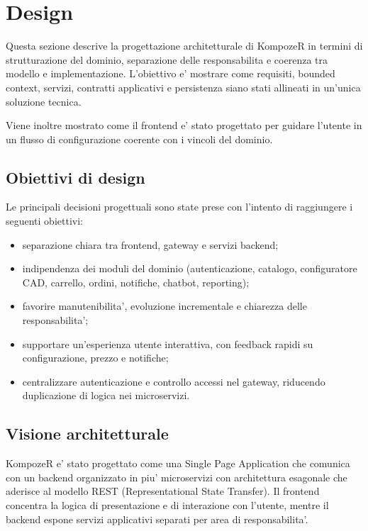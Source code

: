 \section{Design}

Questa sezione descrive la progettazione architetturale di KompozeR in termini di strutturazione del dominio, separazione delle responsabilita e coerenza tra modello e implementazione. L'obiettivo e' mostrare come requisiti, bounded context, servizi, contratti applicativi e persistenza siano stati allineati in un'unica soluzione tecnica.

Viene inoltre mostrato come il frontend e' stato progettato per guidare l'utente in un flusso di configurazione coerente con i vincoli del dominio.

\subsection{Obiettivi di design}

Le principali decisioni progettuali sono state prese con l'intento di raggiungere i seguenti obiettivi:

\begin{itemize}
	\item separazione chiara tra frontend, gateway e servizi backend;
	\item indipendenza dei moduli del dominio (autenticazione, catalogo, configuratore CAD, carrello, ordini, notifiche, chatbot, reporting);
	\item favorire manutenibilita', evoluzione incrementale e chiarezza delle responsabilita';
	\item supportare un'esperienza utente interattiva, con feedback rapidi su configurazione, prezzo e notifiche;
	\item centralizzare autenticazione e controllo accessi nel gateway, riducendo duplicazione di logica nei microservizi.
\end{itemize}

\subsection{Visione architetturale}

KompozeR e' stato progettato come una Single Page Application che comunica con un backend organizzato in piu' microservizi con architettura esagonale che aderisce al modello REST (Representational State Transfer). 
Il frontend concentra la logica di presentazione e di interazione con l'utente, mentre il backend espone servizi applicativi separati per area di responsabilita'.

